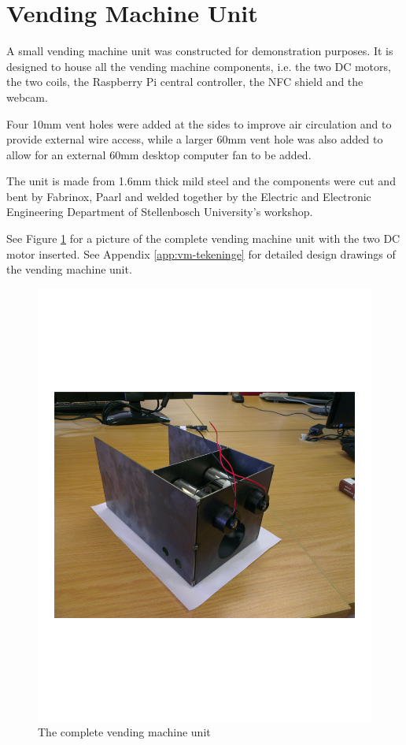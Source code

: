 \section{Vending Machine Unit}

A small vending machine unit was constructed for demonstration purposes. It is
designed to house all the vending machine components, i.e. the two DC motors,
the two coils, the Raspberry Pi central controller, the NFC shield and the
webcam.

Four 10mm vent holes were added at the sides to improve air circulation
and to provide external wire access, while a larger 60mm vent hole was also
added to allow for an external 60mm desktop computer fan to be added. 

The unit is made from 1.6mm thick mild steel and the components were cut and
bent by Fabrinox, Paarl and welded together by the Electric and Electronic
Engineering Department of Stellenbosch University's workshop.

See Figure \ref{fig:vm-actual} for a picture of the
complete vending machine unit with the two DC motor
inserted. See Appendix \ref{app:vm-tekeninge} for detailed
design drawings of the vending machine unit.

\begin{figure}
 \centering 
 \includegraphics[clip=true, trim = 80 150 150 200,
 scale=0.7]{complete_vm}
 \caption{The complete vending machine unit}
 \label{fig:vm-actual}
\end{figure}

